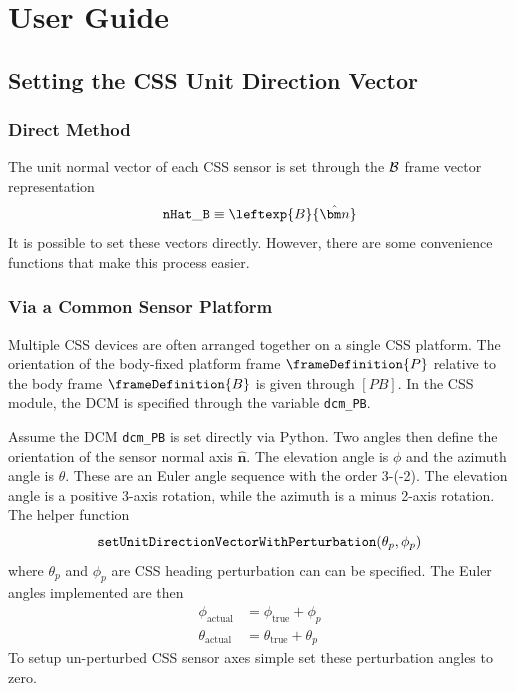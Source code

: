 
\section{User Guide}

\subsection{Setting the CSS Unit Direction Vector}
\subsubsection{Direct Method}
The unit normal vector of each CSS sensor is set through the $\cal B$ frame vector representation
\begin{equation}
		{\tt nHat\_B} \equiv \leftexp{B}{\hat{\bm n}}
\end{equation}
It is possible to set these vectors directly.  However, there are some convenience functions that make this process easier.

\subsubsection{Via a Common Sensor Platform}
Multiple CSS devices are often arranged together on a single CSS platform.  The orientation of the body-fixed platform frame $\frameDefinition{P}$ relative to the body frame $\frameDefinition{B}$ is given through $[PB]$.  In the CSS module, the DCM is specified through the variable {\tt dcm\_PB}.

Assume the DCM  {\tt dcm\_PB} is set directly via Python.  Two angles then define the orientation of the sensor normal axis $\hat{\bm n}$.  The elevation angle is $\phi$ and the azimuth angle is $\theta$.  These are an Euler angle sequence with the order 3-(-2).  The elevation angle is a positive 3-axis rotation, while the azimuth is a minus 2-axis rotation.  The helper function
$$
{\tt setUnitDirectionVectorWithPerturbation}(\theta_{p}, \phi_{p})
$$
where $\theta_{p}$ and $\phi_{p}$ are CSS heading perturbation can can be specified.  The Euler angles implemented are then
\begin{align}
		\phi_{\text{actual}} &= \phi_{\text{true}} + \phi_{p} \\
		\theta_{\text{actual}} &= \theta_{\text{true}} + \theta_{p}
\end{align}
To setup un-perturbed CSS sensor axes simple set these perturbation angles to zero.

